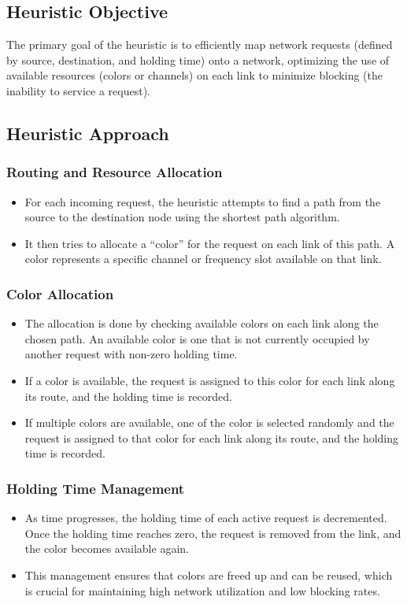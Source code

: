 \documentclass[conference]{IEEEtran}
\begin{document}
\subsection{Heuristic Objective}
The primary goal of the heuristic is to efficiently map network requests (defined by source, destination, and holding time) onto a network, optimizing the use of available resources (colors or channels) on each link to minimize blocking (the inability to service a request).

\subsection{Heuristic Approach}

\subsubsection{Routing and Resource Allocation}
\begin{itemize}
    \item For each incoming request, the heuristic attempts to find a path from the source to the destination node using the shortest path algorithm.
    \item It then tries to allocate a ``color'' for the request on each link of this path. A color represents a specific channel or frequency slot available on that link.
\end{itemize}

\subsubsection{Color Allocation}
\begin{itemize}
    \item The allocation is done by checking available colors on each link along the chosen path. An available color is one that is not currently occupied by another request with non-zero holding time.
    \item If a color is available, the request is assigned to this color for each link along its route, and the holding time is recorded.
    \item If multiple  colors are available, one of the color is selected randomly and  the request is assigned to that color for each link along its route, and the holding time is recorded.
\end{itemize}

\subsubsection{Holding Time Management}
\begin{itemize}
    \item As time progresses, the holding time of each active request is decremented. Once the holding time reaches zero, the request is removed from the link, and the color becomes available again.
    \item This management ensures that colors are freed up and can be reused, which is crucial for maintaining high network utilization and low blocking rates.
\end{itemize}
\end{document}
